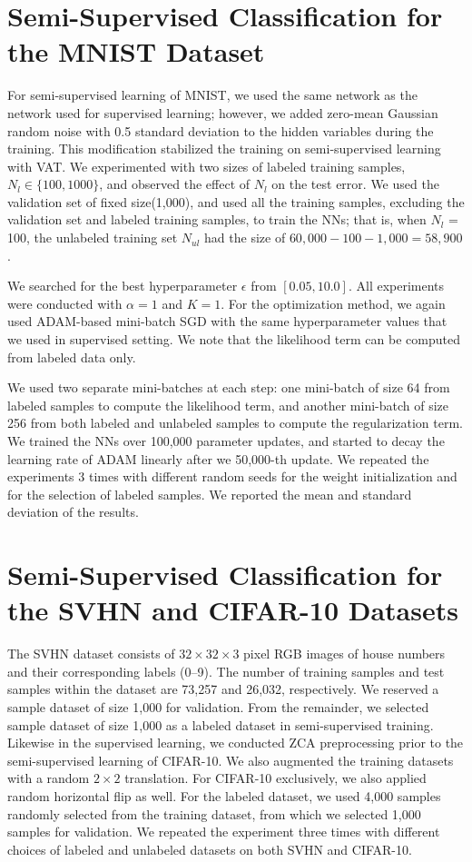 \documentclass[10pt,journal,compsoc]{IEEEtran}
\begin{document}
\section{\label{apd:semi-mnist_exp_set}Semi-Supervised Classification for the MNIST Dataset}
For semi-supervised learning of MNIST, we used the same network as the network used for supervised learning; however, we added zero-mean Gaussian random noise with 0.5 standard deviation to the hidden variables during the training. 
This modification stabilized the training on semi-supervised learning with VAT.
We experimented with two sizes of labeled training samples, $N_l\in \{100, 1000\}$, and observed the effect of $N_l$ on the test error. We used the validation set of fixed size(1,000), and used all the training samples, excluding the validation set and labeled training samples, to train the NNs; that is, when $N_l$ = 100, the unlabeled training set $N_{ul}$ had the size of $60,000-100-1,000=58,900$. 

We searched for the best hyperparameter $\epsilon$ from  $[0.05,10.0]$. All experiments were conducted with $\alpha = 1$ and $K =1$. For the optimization method, we again used ADAM-based mini-batch SGD with the same hyperparameter values that we used in supervised setting. We note that the likelihood term can be computed from labeled data only.

We used two separate mini-batches at each step: one mini-batch of size 64 from labeled samples to compute the likelihood term, and another mini-batch of size 256 from both labeled and unlabeled samples to compute the regularization term. 
We trained the NNs over 100,000 parameter updates, and started to decay the learning rate of ADAM linearly after we 50,000-th update. 
We repeated the experiments 3 times with different random seeds for the weight initialization and for the selection of labeled samples. We reported the mean and standard deviation of the results.

\section{\label{apd:semisup_details}Semi-Supervised Classification for the SVHN and CIFAR-10 Datasets}

The SVHN dataset consists of $32\times 32 \times 3$ pixel RGB images of house numbers and their corresponding labels (0--9). The number of training samples and test samples within the dataset are 73,257 and 26,032, respectively. 
We reserved a sample dataset of size 1,000 for validation. From the remainder, we selected sample dataset of size 1,000 as a labeled dataset in semi-supervised training.
Likewise in the supervised learning, we conducted ZCA preprocessing prior to the semi-supervised learning of CIFAR-10. 
We also augmented the training datasets with a random $2 \times 2$ translation.  For CIFAR-10 exclusively, we also applied random horizontal flip as well.
For the labeled dataset, we used 4,000 samples randomly selected from the training dataset, from which we selected 1,000 samples for validation.
We repeated the experiment three times with different choices of labeled and unlabeled datasets on both SVHN and CIFAR-10.
\end{document}
